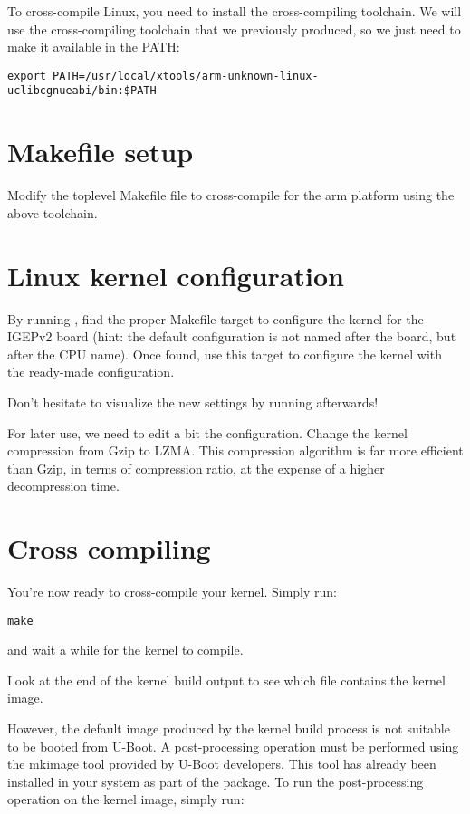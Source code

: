 To cross-compile Linux, you need to install the cross-compiling
toolchain. We will use the cross-compiling toolchain that we
previously produced, so we just need to make it available in the PATH:

\begin{verbatim}
export PATH=/usr/local/xtools/arm-unknown-linux-uclibcgnueabi/bin:$PATH
\end{verbatim}

\section{Makefile setup}

Modify the toplevel Makefile file to cross-compile for the arm
platform using the above toolchain.

\section{Linux kernel configuration}

By running , find the proper Makefile target to
configure the kernel for the IGEPv2 board (hint: the default
configuration is not named after the board, but after the CPU
name). Once found, use this target to configure the kernel with the
ready-made configuration.

Don't hesitate to visualize the new settings by running
 afterwards!

For later use, we need to edit a bit the configuration. Change the
kernel compression from Gzip to LZMA. This compression algorithm is
far more efficient than Gzip, in terms of compression ratio, at the
expense of a higher decompression time.

\section{Cross compiling}

You're now ready to cross-compile your kernel. Simply run:

\begin{verbatim}
make
\end{verbatim}

and wait a while for the kernel to compile.

Look at the end of the kernel build output to see which file contains
the kernel image.

However, the default image produced by the kernel build process is not
suitable to be booted from U-Boot. A post-processing operation must be
performed using the mkimage tool provided by U-Boot developers. This
tool has already been installed in your system as part of the
 package. To run the post-processing operation on
the kernel image, simply run:

